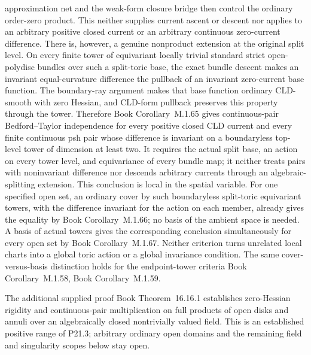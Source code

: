 \documentclass[11pt,a4paper]{article}
\theoremstyle{definition}
\theoremstyle{remark}
\begin{document}
approximation net and the weak-form closure bridge then control the ordinary
order-zero product.  This neither supplies current ascent or descent nor
applies to an arbitrary positive closed current or an arbitrary continuous
zero-current difference.
There is, however, a genuine nonproduct extension at the original split
level.  On every finite tower of equivariant locally trivial standard strict
open-polydisc bundles over such a split-toric base, the exact bundle descent
makes an invariant equal-curvature difference the pullback of an invariant
zero-current base function.  The boundary-ray argument makes that base
function ordinary CLD-smooth with zero Hessian, and CLD-form pullback
preserves this property through the tower.  Therefore
Book Corollary~M.1.65 gives
continuous-pair Bedford--Taylor independence for every positive closed CLD
current and every finite continuous psh pair whose difference is invariant
on a boundaryless top-level tower of dimension at least two.  It requires the
actual split base, an action on every tower level, and equivariance of every
bundle map; it neither treats pairs with noninvariant difference nor descends
arbitrary currents through an algebraic-splitting extension.
This conclusion is local in the spatial variable.  For one specified open
set, an ordinary cover by such boundaryless split-toric equivariant towers,
with the difference invariant for the action on each member, already gives
the equality by
Book Corollary~M.1.66; no basis of the
ambient space is needed.  A basis of actual towers gives the corresponding
conclusion simultaneously for every open set by
Book Corollary~M.1.67.  Neither
criterion turns unrelated local charts into a global toric action or a global
invariance condition.  The same cover-versus-basis distinction holds for the
endpoint-tower criteria
Book Corollary~M.1.58, Book Corollary~M.1.59.

The additional supplied proof
Book Theorem~16.16.1 establishes zero-Hessian
rigidity and continuous-pair multiplication on full products of open disks
and annuli over an algebraically closed nontrivially valued field. This
is an established positive range of P21.3; arbitrary ordinary open domains
and the remaining field and singularity scopes below stay open.
\end{document}
